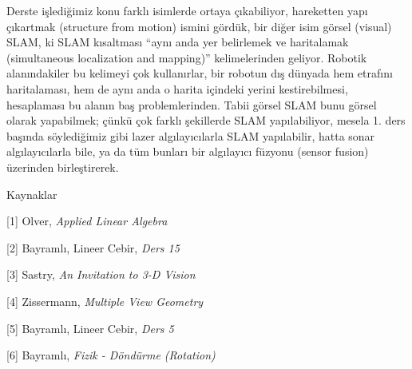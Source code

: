 \documentclass[12pt,fleqn]{article}\usepackage{../../common}
\begin{document}
Derste işlediğimiz konu farklı isimlerde ortaya çıkabiliyor, hareketten
yapı çıkartmak (structure from motion) ismini gördük, bir diğer isim görsel
(visual) SLAM, ki SLAM kısaltması ``aynı anda yer belirlemek ve haritalamak
(simultaneous localization and mapping)'' kelimelerinden geliyor. Robotik
alanındakiler bu kelimeyi çok kullanırlar, bir robotun dış dünyada hem
etrafını haritalaması, hem de aynı anda o harita içindeki yerini
kestirebilmesi, hesaplaması bu alanın baş problemlerinden. Tabii görsel
SLAM bunu görsel olarak yapabilmek; çünkü çok farklı şekillerde SLAM
yapılabiliyor, mesela 1. ders başında söylediğimiz gibi lazer
algılayıcılarla SLAM yapılabilir, hatta sonar algılayıcılarla bile, ya da
tüm bunları bir algılayıcı füzyonu (sensor fusion) üzerinden birleştirerek.


Kaynaklar 

[1] Olver, {\em Applied Linear Algebra}

[2] Bayramlı, Lineer Cebir, {\em Ders 15}

[3] Sastry, {\em An Invitation to 3-D Vision}

[4] Zissermann, {\em Multiple View Geometry}

[5] Bayramlı, Lineer Cebir, {\em Ders 5}

[6] Bayramlı, {\em Fizik - Döndürme (Rotation)}
\end{document}
